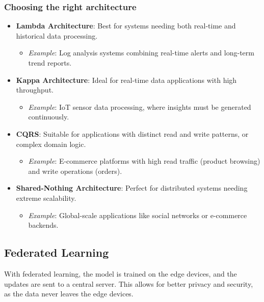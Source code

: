 \subsubsection{Choosing the right architecture}

\begin{itemize}
	\item \textbf{Lambda Architecture}: Best for systems needing both real-time and historical data processing.
	\begin{itemize}
		\item \textit{Example}: Log analysis systems combining real-time alerts and long-term trend reports.
	\end{itemize}
	
	\item \textbf{Kappa Architecture}: Ideal for real-time data applications with high throughput.
	\begin{itemize}
		\item \textit{Example}: IoT sensor data processing, where insights must be generated continuously.
	\end{itemize}
	
	\item \textbf{CQRS}: Suitable for applications with distinct read and write patterns, or complex domain logic.
	\begin{itemize}
		\item \textit{Example}: E-commerce platforms with high read traffic (product browsing) and write operations (orders).
	\end{itemize}
	
	\item \textbf{Shared-Nothing Architecture}: Perfect for distributed systems needing extreme scalability.
	\begin{itemize}
		\item \textit{Example}: Global-scale applications like social networks or e-commerce backends.
	\end{itemize}
\end{itemize}

\subsection{Federated Learning}

With federated learning, the model is trained on the edge devices, and the updates are sent to a central server. This allows for better privacy and security, as the data never leaves the edge devices.


